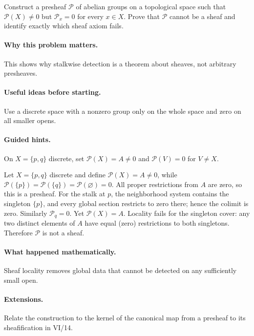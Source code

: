 \begin{problem}
Construct a presheaf $\mathcal P$ of abelian groups on a topological space such that $\mathcal P(X)\neq0$ but $\mathcal P_x=0$ for every $x\in X$. Prove that $\mathcal P$ cannot be a sheaf and identify exactly which sheaf axiom fails.
\end{problem}

\paragraph{Why this problem matters.}
This shows why stalkwise detection is a theorem about sheaves, not arbitrary presheaves.

\paragraph{Useful ideas before starting.}
Use a discrete space with a nonzero group only on the whole space and zero on all smaller opens.

\paragraph{Guided hints.}
On $X=\{p,q\}$ discrete, set $\mathcal P(X)=A\neq0$ and $\mathcal P(V)=0$ for $V\neq X$.

\ifdefined\FullProblemDossiers
\begin{solution}
Let $X=\{p,q\}$ discrete and define $\mathcal P(X)=A\neq0$, while $\mathcal P(\{p\})=\mathcal P(\{q\})=\mathcal P(\varnothing)=0$. All proper restrictions from $A$ are zero, so this is a presheaf. For the stalk at $p$, the neighborhood system contains the singleton $\{p\}$, and every global section restricts to zero there; hence the colimit is zero. Similarly $\mathcal P_q=0$. Yet $\mathcal P(X)=A$. Locality fails for the singleton cover: any two distinct elements of $A$ have equal (zero) restrictions to both singletons. Therefore $\mathcal P$ is not a sheaf.
\end{solution}

\paragraph{What happened mathematically.}
Sheaf locality removes global data that cannot be detected on any sufficiently small open.

\paragraph{Extensions.}
Relate the construction to the kernel of the canonical map from a presheaf to its sheafification in VI/14.
\fi
